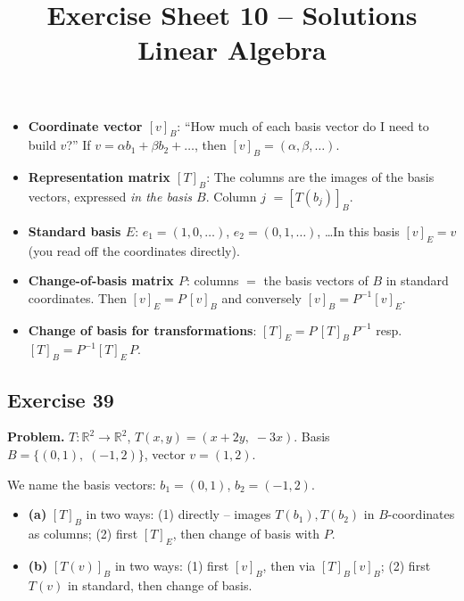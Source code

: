 \documentclass[a4paper,12pt]{article}
\title{Exercise Sheet 10 -- Solutions \\ \large Linear Algebra}
\author{}
\date{}
\begin{document}
\maketitle

\begin{begriffe}
\begin{itemize}[leftmargin=*, nosep]
    \item \textbf{Coordinate vector $[v]_B$}: ``How much of each basis vector do I need to build $v$?'' If $v = \alpha b_1 + \beta b_2 + \dots$, then $[v]_B = (\alpha, \beta, \dots)$.
    \item \textbf{Representation matrix $[T]_B$}: The columns are the images of the basis vectors, expressed \emph{in the basis $B$}. Column $j$ $= [T(b_j)]_B$.
    \item \textbf{Standard basis $E$}: $e_1 = (1,0,\dots)$, $e_2 = (0,1,\dots)$, \dots In this basis $[v]_E = v$ (you read off the coordinates directly).
    \item \textbf{Change-of-basis matrix $P$}: columns $=$ the basis vectors of $B$ in standard coordinates. Then $[v]_E = P\,[v]_B$ and conversely $[v]_B = P^{-1} [v]_E$.
    \item \textbf{Change of basis for transformations}: $[T]_E = P\,[T]_B\,P^{-1}$ \quad resp. \quad $[T]_B = P^{-1} [T]_E\, P$.
\end{itemize}
\end{begriffe}

\subsection*{Exercise 39}

\textbf{Problem.} $T \colon \mathbb{R}^2 \to \mathbb{R}^2$, $T(x, y) = (x + 2y,\; -3x)$. Basis $B = \{(0,1),\; (-1,2)\}$, vector $v = (1, 2)$.

We name the basis vectors: $b_1 = (0, 1)$, $b_2 = (-1, 2)$.

\begin{wastun}
\begin{itemize}[leftmargin=*, nosep]
    \item \textbf{(a)} $[T]_B$ in two ways: (1) directly -- images $T(b_1), T(b_2)$ in $B$-coordinates as columns; (2) first $[T]_E$, then change of basis with $P$.
    \item \textbf{(b)} $[T(v)]_B$ in two ways: (1) first $[v]_B$, then via $[T]_B [v]_B$; (2) first $T(v)$ in standard, then change of basis.
\end{itemize}
\end{wastun}
\end{document}
